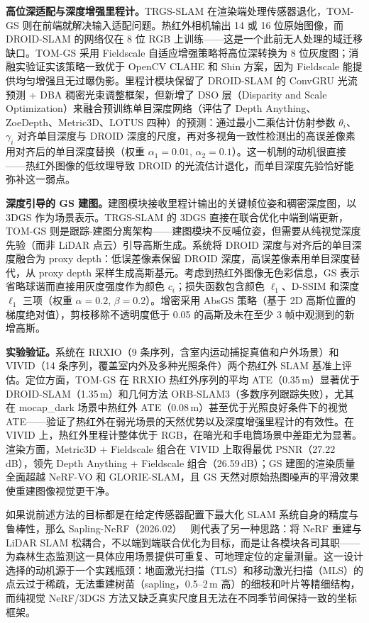 \textbf{高位深适配与深度增强里程计。}TRGS-SLAM 在渲染端处理传感器退化，TOM-GS 则在前端就解决输入适配问题。热红外相机输出 14 或 16 位原始图像，而 DROID-SLAM 的网络仅在 8 位 RGB 上训练——这是一个此前无人处理的域迁移缺口。TOM-GS 采用 Fieldscale 自适应增强策略将高位深转换为 8 位灰度图；消融实验证实该策略一致优于 OpenCV CLAHE 和 Shin 方案，因为 Fieldscale 能提供均匀增强且无过曝伪影。里程计模块保留了 DROID-SLAM 的 ConvGRU 光流预测 + DBA 稠密光束调整框架，但新增了 DSO 层（Disparity and Scale Optimization）来融合预训练单目深度网络（评估了 Depth Anything、ZoeDepth、Metric3D、LOTUS 四种）的预测：通过最小二乘估计仿射参数 $\theta_i$、$\gamma_i$ 对齐单目深度与 DROID 深度的尺度，再对多视角一致性检测出的高误差像素用对齐后的单目深度替换（权重 $\alpha_1{=}0.01$, $\alpha_2{=}0.1$）。这一机制的动机很直接——热红外图像的低纹理导致 DROID 的光流估计退化，而单目深度先验恰好能弥补这一弱点。

\textbf{深度引导的 GS 建图。}建图模块接收里程计输出的关键帧位姿和稠密深度图，以 3DGS 作为场景表示。TRGS-SLAM 的 3DGS 直接在联合优化中端到端更新，TOM-GS 则是跟踪-建图分离架构——建图模块不反哺位姿，但需要从纯视觉深度先验（而非 LiDAR 点云）引导高斯生成。系统将 DROID 深度与对齐后的单目深度融合为 proxy depth：低误差像素保留 DROID 深度，高误差像素用单目深度替代，从 proxy depth 采样生成高斯基元。考虑到热红外图像无色彩信息，GS 表示省略球谐而直接用灰度强度作为颜色 $c_i$；损失函数包含颜色 $\ell_1$、D-SSIM 和深度 $\ell_1$ 三项（权重 $\alpha{=}0.2$, $\beta{=}0.2$）。增密采用 AbsGS 策略（基于 2D 高斯位置的梯度绝对值），剪枝移除不透明度低于 0.05 的高斯及未在至少 3 帧中观测到的新增高斯。

\textbf{实验验证。}系统在 RRXIO（9 条序列，含室内运动捕捉真值和户外场景）和 VIVID（14 条序列，覆盖室内外及多种光照条件）两个热红外 SLAM 基准上评估。定位方面，TOM-GS 在 RRXIO 热红外序列的平均 ATE（0.35\,m）显著优于 DROID-SLAM（1.35\,m）和几何方法 ORB-SLAM3（多数序列跟踪失败），尤其在 mocap\_dark 场景中热红外 ATE（0.08\,m）甚至优于光照良好条件下的视觉 ATE——验证了热红外在弱光场景的天然优势以及深度增强里程计的有效性。在 VIVID 上，热红外里程计整体优于 RGB，在暗光和手电筒场景中差距尤为显著。渲染方面，Metric3D + Fieldscale 组合在 VIVID 上取得最优 PSNR（27.22\,dB），领先 Depth Anything + Fieldscale 组合（26.59\,dB）；GS 建图的渲染质量全面超越 NeRF-VO 和 GLORIE-SLAM，且 GS 天然对原始热图噪声的平滑效果使重建图像视觉更干净。

如果说前述方法的目标都是在给定传感器配置下最大化 SLAM 系统自身的精度与鲁棒性，那么 Sapling-NeRF（2026.02）~\cite{2602_22731} 则代表了另一种思路：将 NeRF 重建与 LiDAR SLAM 松耦合，不以端到端联合优化为目标，而是让各模块各司其职——为森林生态监测这一具体应用场景提供可重复、可地理定位的定量测量。这一设计选择的动机源于一个实践瓶颈：地面激光扫描（TLS）和移动激光扫描（MLS）的点云过于稀疏，无法重建树苗（sapling，0.5--2\,m 高）的细枝和叶片等精细结构，而纯视觉 NeRF/3DGS 方法又缺乏真实尺度且无法在不同季节间保持一致的坐标框架。

